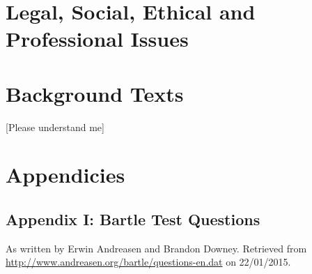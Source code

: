 \documentclass[12pt]{article}
\begin{document}
\section{Legal, Social, Ethical and Professional Issues}
\label{sec:issues}

\section{Background Texts}
[Please understand me]

\section{Appendicies}
\subsection{Appendix I: Bartle Test Questions}
As written by Erwin Andreasen and Brandon Downey. Retrieved from \url{http://www.andreasen.org/bartle/questions-en.dat} on 22/01/2015.
\linespread{1.0}

\linespread{1.3}



\end{document}
